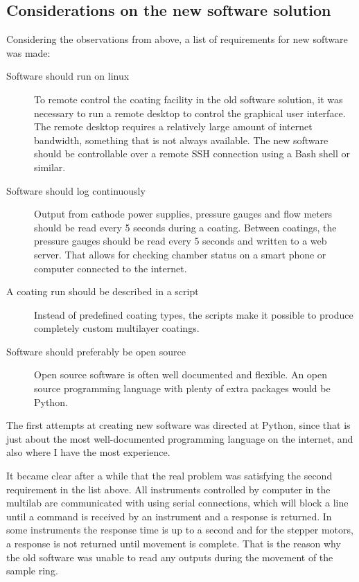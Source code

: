 \subsection{Considerations on the new software solution}
Considering the observations from above, a list of requirements for new software was made:

\begin{description}
  \item[Software should run on linux] To remote control the coating facility in the old software solution, it was necessary to run a remote desktop to control the graphical user interface. The remote desktop requires a relatively large amount of internet bandwidth, something that is not always available. The new software should be controllable over a remote SSH connection using a Bash shell or similar.
  \item[Software should log continuously] Output from cathode power supplies, pressure gauges and flow meters should be read every 5 seconds during a coating. Between coatings, the pressure gauges should be read every 5 seconds and written to a web server. That allows for checking chamber status on a smart phone or computer connected to the internet.
  \item[A coating run should be described in a script] Instead of predefined coating types, the scripts make it possible to produce completely custom multilayer coatings.
  \item[Software should preferably be open source] Open source software is often well documented and flexible. An open source programming language with plenty of extra packages would be Python.
\end{description}

The first attempts at creating new software was directed at Python, since that is just about the most well-documented programming language on the internet, and also where I have the most experience.

It became clear after a while that the real problem was satisfying the second requirement in the list above. All instruments controlled by computer in the multilab are communicated with using serial connections, which will block a line until a command is received by an instrument and a response is returned. In some instruments the response time is up to a second and for the stepper motors, a response is not returned until movement is complete. That is the reason why the old software was unable to read any outputs during the movement of the sample ring.

